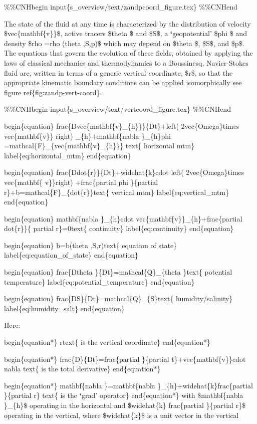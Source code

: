 \documentclass[letterpaper,10pt,english]{sphinxmanual}
\begin{document}
\%\%CNHbegin
input\{s\_overview/text/zandpcoord\_figure.tex\}
\%\%CNHend

The state of the fluid at any time is characterized by the distribution of
velocity \$vec\{mathbf\{v\}\}\$, active tracers \$theta \$ and \$S\$, a
{\color{red}\bfseries{}{}`}geopotential' \$phi \$ and density \$rho =rho (theta ,S,p)\$ which may
depend on \$theta \$, \$S\$, and \$p\$. The equations that govern the evolution
of these fields, obtained by applying the laws of classical mechanics and
thermodynamics to a Boussinesq, Navier-Stokes fluid are, written in terms of
a generic vertical coordinate, \$r\$, so that the appropriate
kinematic boundary conditions can be applied isomorphically
see figure ref\{fig:zandp-vert-coord\}.

\%\%CNHbegin
input\{s\_overview/text/vertcoord\_figure.tex\}
\%\%CNHend

begin\{equation\}
frac\{Dvec\{mathbf\{v\}\_\{h\}\}\}\{Dt\}+left( 2vec\{Omega\}times vec\{mathbf\{v\}\}
right) \_\{h\}+mathbf\{nabla \}\_\{h\}phi =mathcal\{F\}\_\{vec\{mathbf\{v\}\_\{h\}\}\}
text\{ horizontal mtm\} label\{eq:horizontal\_mtm\}
end\{equation\}

begin\{equation\}
frac\{Ddot\{r\}\}\{Dt\}+widehat\{k\}cdot left( 2vec\{Omega\}times vec\{mathbf\{
v\}\}right) +frac\{partial phi \}\{partial r\}+b=mathcal\{F\}\_\{dot\{r\}\}text\{
vertical mtm\} label\{eq:vertical\_mtm\}
end\{equation\}

begin\{equation\}
mathbf\{nabla \}\_\{h\}cdot vec\{mathbf\{v\}\}\_\{h\}+frac\{partial dot\{r\}\}\{
partial r\}=0text\{ continuity\}  label\{eq:continuity\}
end\{equation\}

begin\{equation\}
b=b(theta ,S,r)text\{ equation of state\} label\{eq:equation\_of\_state\}
end\{equation\}

begin\{equation\}
frac\{Dtheta \}\{Dt\}=mathcal\{Q\}\_\{theta \}text\{ potential temperature\}
label\{eq:potential\_temperature\}
end\{equation\}

begin\{equation\}
frac\{DS\}\{Dt\}=mathcal\{Q\}\_\{S\}text\{ humidity/salinity\}
label\{eq:humidity\_salt\}
end\{equation\}

Here:

begin\{equation*\}
rtext\{ is the vertical coordinate\}
end\{equation*\}

begin\{equation*\}
frac\{D\}\{Dt\}=frac\{partial \}\{partial t\}+vec\{mathbf\{v\}\}cdot nabla text\{
is the total derivative\}
end\{equation*\}

begin\{equation*\}
mathbf\{nabla \}=mathbf\{nabla \}\_\{h\}+widehat\{k\}frac\{partial \}\{partial r\}
text\{ is the {\color{red}\bfseries{}{}`}grad' operator\}
end\{equation*\}
with \$mathbf\{nabla \}\_\{h\}\$ operating in the horizontal and \$widehat\{k\}
frac\{partial \}\{partial r\}\$ operating in the vertical, where \$widehat\{k\}\$
is a unit vector in the vertical
\end{document}
